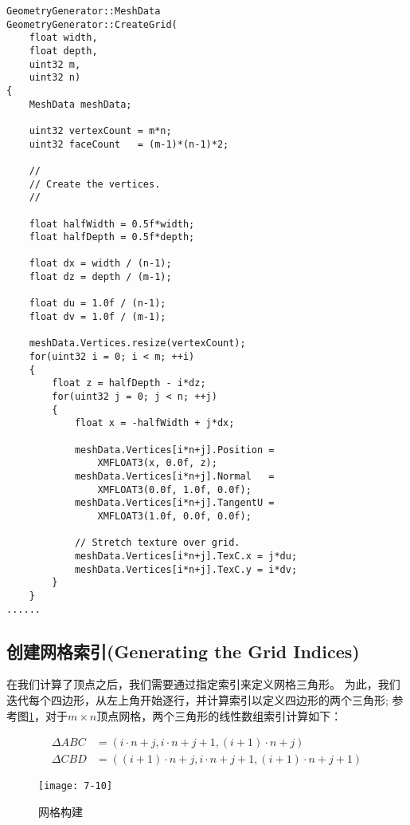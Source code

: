 \begin{lstlisting}
GeometryGenerator::MeshData 
GeometryGenerator::CreateGrid(
    float width, 
    float depth, 
    uint32 m, 
    uint32 n)
{
    MeshData meshData;

    uint32 vertexCount = m*n;
    uint32 faceCount   = (m-1)*(n-1)*2;

    //
    // Create the vertices.
    //

    float halfWidth = 0.5f*width;
    float halfDepth = 0.5f*depth;

    float dx = width / (n-1);
    float dz = depth / (m-1);

    float du = 1.0f / (n-1);
    float dv = 1.0f / (m-1);

    meshData.Vertices.resize(vertexCount);
    for(uint32 i = 0; i < m; ++i)
    {
        float z = halfDepth - i*dz;
        for(uint32 j = 0; j < n; ++j)
        {
            float x = -halfWidth + j*dx;

            meshData.Vertices[i*n+j].Position = 
                XMFLOAT3(x, 0.0f, z);
            meshData.Vertices[i*n+j].Normal   = 
                XMFLOAT3(0.0f, 1.0f, 0.0f);
            meshData.Vertices[i*n+j].TangentU = 
                XMFLOAT3(1.0f, 0.0f, 0.0f);

            // Stretch texture over grid.
            meshData.Vertices[i*n+j].TexC.x = j*du;
            meshData.Vertices[i*n+j].TexC.y = i*dv;
        }
    }
......
\end{lstlisting}

\subsection{创建网格索引(Generating the Grid Indices)}
\begin{flushleft}
在我们计算了顶点之后，我们需要通过指定索引来定义网格三角形。 为此，我们迭代每个四边形，从左上角开始逐行，并计算索引以定义四边形的两个三角形; 参考图\ref{fig:7-10}，对于$m\times n$顶点网格，两个三角形的线性数组索引计算如下：\\
\end{flushleft}

\begin{align*}
\Delta ABC&=(i\cdot n+j,i\cdot n+j+1,(i+1)\cdot n+j)\\
\Delta CBD&=((i+1)\cdot n+j,i\cdot n+j+1,(i+1)\cdot n+j+1)
\end{align*}

\begin{figure}[h]
    \texttt{[image: 7-10]}
    \centering
    \caption{网格构建}
    \label{fig:7-10}
\end{figure}
\clearpage

